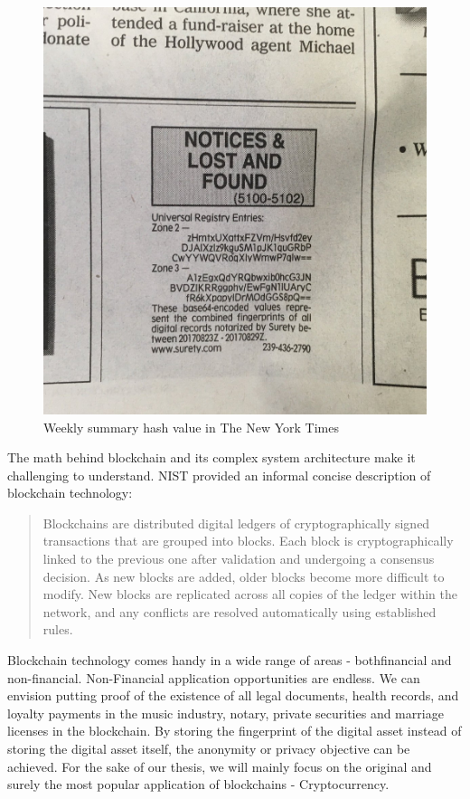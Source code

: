 \begin{figure}[h!]
	\centering
	\includegraphics[width=.35\textwidth]{images/Widely_Witnessed_Values.jpg}
	\caption[Widely-Witnessed Values of Surety, a weekly summary (hash) of documents]{Weekly summary hash value in The New York Times}
	\label{fig:first_blockchain}
\end{figure}

The math behind blockchain and its complex system architecture make it challenging to understand. 
NIST provided an informal concise description of blockchain technology:

\begin{quote} 
Blockchains are distributed digital ledgers of cryptographically signed transactions that are grouped into blocks. 
Each block is cryptographically linked to the previous one after validation and undergoing a consensus decision. 
As new blocks are added, older blocks become more difficult to modify. 
New blocks are replicated across all copies of the ledger within the network, and any conflicts are resolved automatically using established rules. 
\end{quote}

Blockchain technology comes handy in a wide range of areas - both ​financial​ and non-financial​. 
Non-Financial​ application opportunities are endless. 
We can envision putting proof of the existence of all legal documents, health records, and loyalty payments in the music industry, notary, private securities and marriage licenses in the blockchain. 
By storing the fingerprint of the digital asset instead of storing the digital asset itself, the anonymity or privacy objective can be achieved.
For the sake of our thesis, we will mainly focus on the original and surely the most popular application of blockchains - Cryptocurrency.

